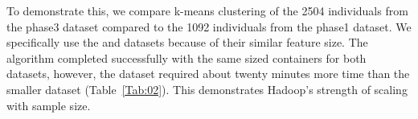 \documentclass{bioinfo}
\begin{document}
To demonstrate this, we compare k-means clustering of the 2504 individuals from the phase3 dataset compared to the 1092 individuals from the phase1 dataset.
We specifically use the \SevenPhaseone{} and \ThreePhasethree{} datasets because of their similar feature size.
The algorithm completed successfully with the same sized containers for both datasets, however, the \ThreePhasethree{} dataset required about twenty minutes more time than the smaller \SevenPhaseone{} dataset (Table~\ref{Tab:02}). 
This demonstrates Hadoop's strength of scaling with sample size. 




\end{document}
